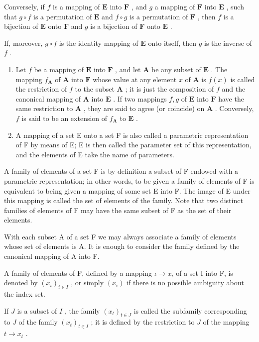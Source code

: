 Conversely, if \(f\) is a mapping of \(\mathbf{E}\) into \(\mathbf{F}\) , and \(g\) a mapping of \(\mathbf{F}\) into \(\mathbf{E}\) , such that \(g \circ f\) is a permutation of \(\mathbf{E}\) and \(f \circ g\) is a permutation of \(\mathbf{F}\) , then \(f\) is a bijection of \(\mathbf{E}\) onto \(\mathbf{F}\) and \(g\) is a bijection of \(\mathbf{F}\) onto \(\mathbf{E}\) .

If, moreover, \(g \circ f\) is the identity mapping of \(\mathbf{E}\) onto itself, then \(g\) is the inverse of \(f\) .

\begin{enumerate}
\def\labelenumi{\arabic{enumi}.}
\setcounter{enumi}{12}
\item
  Let \(f\) be a mapping of \(\mathbf{E}\) into \(\mathbf{F}\) , and let \(\mathbf{A}\) be any subset of \(\mathbf{E}\) . The mapping \(f_{\mathbf{A}}\) of \(\mathbf{A}\) into \(\mathbf{F}\) whose value at any element \(x\) of \(\mathbf{A}\) is \(f(x)\) is called the restriction of \(f\) to the subset \(\mathbf{A}\) ; it is just the composition of \(f\) and the canonical mapping of \(\mathbf{A}\) into \(\mathbf{E}\) . If two mappings \(f, g\) of \(\mathbf{E}\) into \(\mathbf{F}\) have the same restriction to \(\mathbf{A}\) , they are said to agree (or coincide) on \(\mathbf{A}\) . Conversely, \(f\) is said to be an extension of \(f_{\mathbf{A}}\) to \(\mathbf{E}\) .
\item
  A mapping of a set E onto a set F is also called a parametric representation of F by means of E; E is then called the parameter set of this representation, and the elements of E take the name of parameters.
\end{enumerate}

A family of elements of a set F is by definition a subset of F endowed with a parametric representation; in other words, to be given a family of elements of F is equivalent to being given a mapping of some set E into F. The image of E under this mapping is called the set of elements of the family. Note that two distinct families of elements of F may have the same subset of F as the set of their elements.

With each subset A of a set F we may always associate a family of elements whose set of elements is A. It is enough to consider the family defined by the canonical mapping of A into F.

A family of elements of F, defined by a mapping \(\iota\to x_{i}\) of a set I into F, is denoted by \((x_{i})_{i\in I}\) , or simply \((x_{i})\) if there is no possible ambiguity about the index set.

If \(J\) is a subset of \(I\) , the family \((x_{t})_{t\in J}\) is called the subfamily corresponding to \(J\) of the family \((x_{t})_{t\in I}\) ; it is defined by the restriction to \(J\) of the mapping \(t\to x_t\) .


